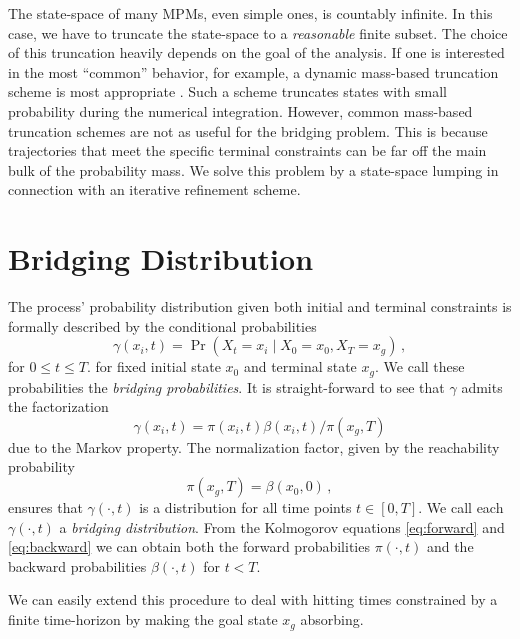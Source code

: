 The state-space of many \acp{MPM}, even simple ones, is countably infinite.
In this case, we have to truncate the state-space to a \emph{reasonable}
finite subset.
The choice of this truncation heavily depends on the goal of the
analysis.
If one is interested in the most ``common'' behavior, for example,
a dynamic mass-based truncation scheme is most appropriate \parencite{mikeev2019approximate}.
Such a scheme truncates states with small probability during the numerical integration.
However, common mass-based truncation schemes are not as useful for the
bridging problem. This is because trajectories that meet
the specific terminal constraints can be far off the main bulk of the
probability mass.
We solve this problem by a state-space lumping in connection with an
iterative refinement scheme.


\section{Bridging Distribution}\label{sec:bridge_dist}
The process' probability distribution given both initial and terminal constraints is formally described  by
the conditional probabilities
\begin{equation}\label{eq:bridge_dist}
    \gamma(x_i, t) = \Pr(X_t = x_i \mid X_0 = x_0, X_T = x_g)\,,
\end{equation}
for $0\leq t\leq T$.
for fixed initial state $x_0$ and terminal state $x_g$.
We call these probabilities the \emph{bridging probabilities}.
It is straight-forward to see that      $\gamma$ admits the
factorization
\begin{equation}\label{eq:bridge_fact}
    \gamma(x_i, t) = \pi(x_i, t)\beta(x_i, t)/\pi(x_g, T)
\end{equation}
due to the Markov property.
The normalization factor, given by the reachability probability 
\[
	\pi(x_g, T)=\beta(x_0, 0)\,,
\]
ensures that $\gamma(\cdot, t)$ is 
a distribution for all time points $t\in[0,T]$.
We call each $\gamma(\cdot, t)$ a   \emph{bridging distribution}.
From the Kolmogorov equations \eqref{eq:forward} and \eqref{eq:backward}
we can obtain both the forward probabilities $\pi(\cdot, t)$ and the backward probabilities
$\beta(\cdot, t)$ for $t< T$.


We can easily extend this procedure to deal with hitting times
constrained by a finite time-horizon by making the goal state $x_g$ absorbing.


